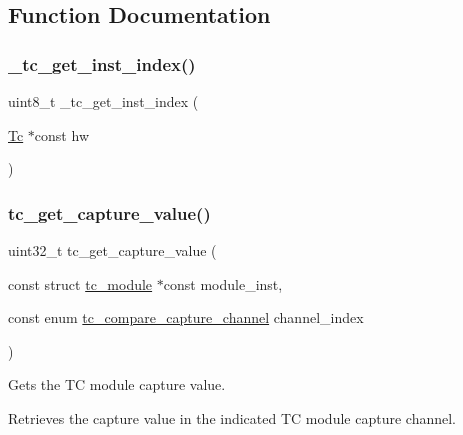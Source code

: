 \subsection{Function Documentation}
\mbox{\label{group__asfdoc__sam0__tc__group_ga077a238b03327682013a0bceb4fc44b2}} 
\subsubsection{\texorpdfstring{\_tc\_get\_inst\_index()}{\_tc\_get\_inst\_index()}}
{\footnotesize\ttfamily uint8\+\_\+t \+\_\+tc\+\_\+get\+\_\+inst\+\_\+index (\begin{DoxyParamCaption}\item[{\mbox{\hyperlink{union_tc}{Tc}} $\ast$const}]{hw }\end{DoxyParamCaption})}

\mbox{\label{group__asfdoc__sam0__tc__group_gaf780bb09a00298868aa3b8e7627f92ff}} 
\subsubsection{\texorpdfstring{tc\_get\_capture\_value()}{tc\_get\_capture\_value()}}
{\footnotesize\ttfamily uint32\+\_\+t tc\+\_\+get\+\_\+capture\+\_\+value (\begin{DoxyParamCaption}\item[{const struct \mbox{\hyperlink{structtc__module}{tc\+\_\+module}} $\ast$const}]{module\+\_\+inst,  }\item[{const enum \mbox{\hyperlink{group__asfdoc__sam0__tc__group_ga01eca97dbfd588fd3ba0dcfd4792d857}{tc\+\_\+compare\+\_\+capture\+\_\+channel}}}]{channel\+\_\+index }\end{DoxyParamCaption})}



Gets the TC module capture value. 

Retrieves the capture value in the indicated TC module capture channel.


